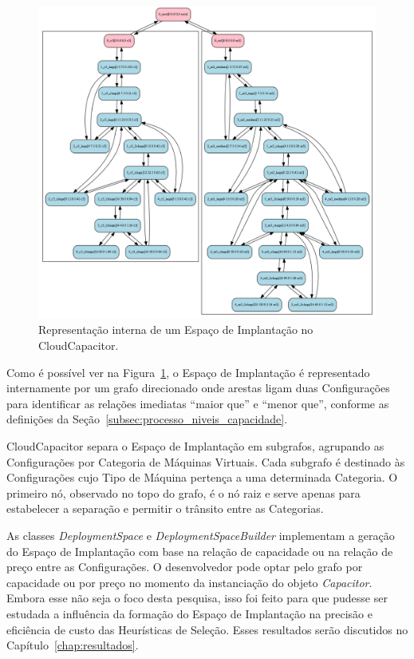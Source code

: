 \begin{figure}[t]
  \begin{center}
    \includegraphics[width=\linewidth]{img/exemplo_grafo_espaco_implantacao}
  \end{center}
  \caption{\label{fig:depspace_real}Representação interna de um Espaço de Implantação no CloudCapacitor.}
\end{figure}

Como é possível ver na Figura~\ref{fig:depspace_real}, o Espaço de Implantação é 
representado internamente por um grafo direcionado onde arestas ligam duas 
Configurações para identificar as relações imediatas ``maior que'' e ``menor que'', 
conforme as definições da Seção~\ref{subsec:processo_niveis_capacidade}. 

CloudCapacitor separa o Espaço de Implantação em subgrafos, agrupando as
Configurações por Categoria de Máquinas Virtuais. Cada subgrafo é destinado às
Configurações cujo Tipo de Máquina pertença a uma determinada Categoria. O primeiro
nó, observado no topo do grafo, é o nó raiz e serve apenas para estabelecer a 
separação e permitir o trânsito entre as Categorias.

As classes \emph{DeploymentSpace} e \emph{DeploymentSpaceBuilder} implementam
a geração do Espaço de Implantação com base na relação de capacidade ou na relação
de preço entre as Configurações. O desenvolvedor pode optar pelo grafo por capacidade ou por preço no momento da
instanciação do objeto \emph{Capacitor}. Embora esse não seja o foco desta 
pesquisa, isso foi feito para que pudesse ser estudada a influência da formação 
do Espaço de Implantação na precisão e eficiência de custo das Heurísticas de 
Seleção. Esses resultados serão discutidos no Capítulo~\ref{chap:resultados}.

